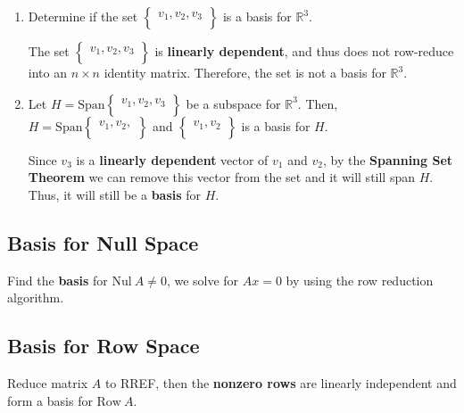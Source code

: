 \documentclass[12pt, letterpaper]{article}
\begin{document}
\begin{enumerate}
  \item Determine if the set $
    \begin{Bmatrix}
      v_1, v_2, v_3 \\
    \end{Bmatrix} $ is a basis for $ \mathbb{R}^3 $.
    \bigskip

    The set $
    \begin{Bmatrix}
      v_1, v_2, v_3 \\
    \end{Bmatrix} $ is \textbf{linearly dependent}, and thus does not
    row-reduce into an $ n \times n $ identity matrix. Therefore, the
    set is not a basis for $ \mathbb{R}^3 $.
  \item Let $ H = \textrm{Span}
    \begin{Bmatrix}
      v_1, v_2, v_3 \\
    \end{Bmatrix} $ be a subspace for $ \mathbb{R}^3 $. Then, $ H =
    \textrm{Span}
    \begin{Bmatrix}
      v_1, v_2, \\
    \end{Bmatrix} $ and $
    \begin{Bmatrix}
      v_1, v_2 \\
    \end{Bmatrix} $ is a basis for $ H $.
    \bigskip

    Since $ v_3 $ is a \textbf{linearly dependent} vector of $ v_1 $
    and $ v_2 $, by the \textbf{Spanning Set Theorem} we can remove
    this vector from the set and it will still span $ H $. Thus, it
    will still be a \textbf{basis} for $ H $.
\end{enumerate}

\subsection*{Basis for Null Space}

Find the \textbf{basis} for $ \textrm{Nul} \: A \neq 0 $, we solve
for $ Ax = 0 $ by using the row reduction algorithm.

\subsection*{Basis for Row Space}

Reduce matrix $ A $ to RREF, then the \textbf{nonzero rows} are
linearly independent and form a basis for $ \textrm{Row} \: A $.
\end{document}
